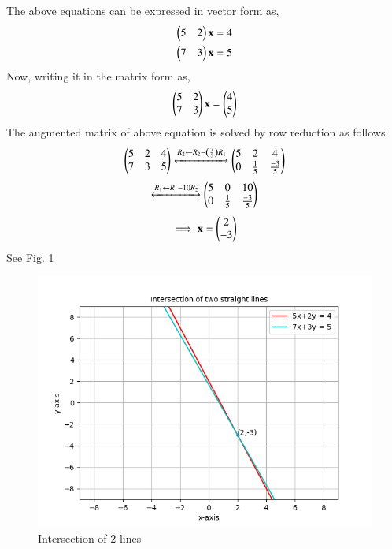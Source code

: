 The above equations can be expressed in vector form as,
\begin{align}
\begin{pmatrix}5 & 2\end{pmatrix}\mathbf{x} = 4\\
\begin{pmatrix}7 & 3\end{pmatrix}\mathbf{x} = 5
\end{align}
Now, writing it in the matrix form as, 
\begin{align}
\begin{pmatrix}5 & 2 \\ 7 & 3\end{pmatrix}\mathbf{x} = \begin{pmatrix}4 \\ 5\end{pmatrix}
\end{align}
The augmented matrix of above equation is solved by row reduction as follows
\begin{align}
\begin{pmatrix}5 & 2 & 4 \\ 7 & 3 & 5\end{pmatrix}  \xleftrightarrow[]{R_2\leftarrow R_2-\ensuremath{\left(\frac{7}{5}\right)}R_1} \begin{pmatrix}5 & 2 & 4 \\ 0 & \frac{1}{5} & \frac{-3}{5}\end{pmatrix}
\end{align}
\begin{align}
\xleftrightarrow[]{R_1\leftarrow R_1-10R_2} \begin{pmatrix}5 & 0 & 10 \\ 0 & \frac{1}{5} & \frac{-3}{5}\end{pmatrix}
\end{align}
\begin{align}
\implies \mathbf{x} = \begin{pmatrix}2 \\ -3\end{pmatrix}
\end{align}
See Fig. \ref{Fig 1:solutions/det/58/}

\begin{figure}
\centering
\includegraphics[width=\columnwidth]{./solutions/det/58/Figure_2.png}
\caption{Intersection of 2 lines}
\label{Fig 1:solutions/det/58/}
\end{figure}
